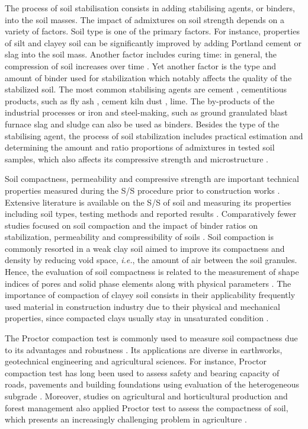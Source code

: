 \documentclass{amestyle}
\begin{document}
The process of soil stabilisation consists in adding stabilising agents, or binders, into the soil masses. The impact of admixtures on soil strength depends on a variety of factors. Soil type is one of the primary factors. For instance, properties of silt and clayey soil can be significantly improved by adding Portland cement or slag into the soil mass. Another factor includes curing time: in general, the compression of soil increases over time \cite{Lindh202102}. Yet another factor is the type and amount of binder used for stabilization which notably affects the quality of the stabilized soil. The most common stabilising agents are cement \cite{Rekik}, cementitious products, such as fly ash \cite{Tastan,Hasan}, cement kiln dust \cite{Solanki,Lindh2021a}, lime. The by-products of the industrial processes or iron and steel-making, such as ground granulated blast furnace slag \cite{Mozejko} and sludge \cite{Ingunza,Sharif} can also be used as binders. Besides the type of the stabilising agent, the process of soil stabilization includes practical estimation and determining the amount and ratio proportions of admixtures in tested soil samples, which also affects its compressive strength and microstructure \cite{Lindh2001,Ahmed}.

Soil compactness, permeability and compressive strength are important technical properties measured during the S/S procedure prior to construction works \cite{LindhWinter,XU2021114774}. Extensive literature is available on the S/S of soil and measuring its properties including soil types, testing methods and reported results \cite{Anagnostopoulos,Kallenetal2016,Lemenkov2021a,HUANG2022115452}. Comparatively fewer studies focused on soil compaction and the impact of binder ratios on stabilization, permeability and compressibility of soils \cite{Kongkitkul,Leeetal2007}. Soil compaction is commonly resorted in a weak clay soil aimed to improve its compactness and density by reducing void space, \emph{i.e.}, the amount of air between the soil granules. Hence, the evaluation of soil compactness is related to the measurement of shape indices of pores and solid phase elements along with physical parameters \cite{Bryk}. The importance of compaction of clayey soil consists in their applicability frequently used material in construction industry due to their physical and mechanical properties, since compacted clays usually stay in unsaturated condition \cite{Zou}. 

The Proctor compaction test is commonly used to measure soil compactness due to its advantages and robustness \cite{Wasman,Matteo,Boudlal}. Its applications are diverse in earthworks, geotechnical engineering and agricultural sciences. For instance, Proctor compaction test has long been used to assess safety and bearing capacity of roads, pavements and building foundations using evaluation of the heterogeneous subgrade \cite{Barden,Jibon}. Moreover, studies on agricultural and horticultural production and forest management also applied Proctor test to assess the compactness of soil, which presents an increasingly challenging problem in agriculture \cite{ARAGON2000197,Bayat,Nhantumbo,ALAOUI20111}. 
\end{document}
